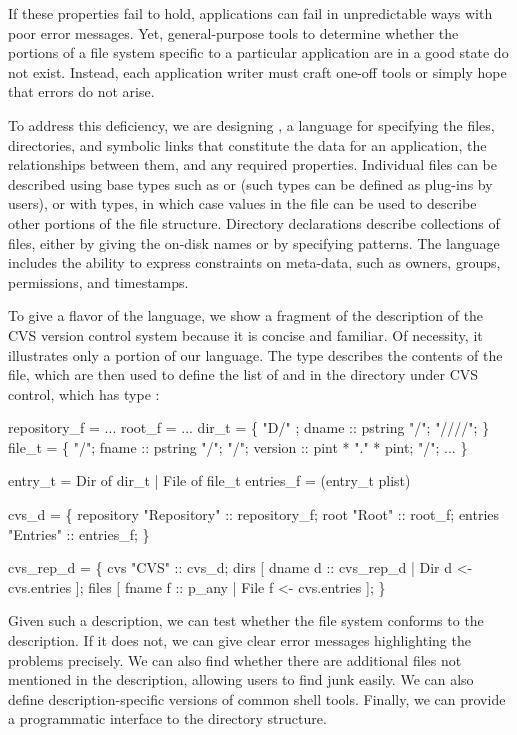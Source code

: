 \documentclass[nocopyrightspace,10pt]{sigplanconf}
\begin{document}
If these properties fail to hold, applications can fail in
unpredictable ways with poor error messages.  Yet, general-purpose
tools to determine whether the portions of a file system specific to a
particular application are in a good state do not exist.  Instead, each
application writer must craft one-off tools or simply hope that errors
do not arise. 

To address this deficiency, we are designing \dirpads{}, a language
for specifying the files, directories, and symbolic links that
constitute the data for an application, the relationships between
them, and any required properties.  Individual files can be described
using base types such as  or  (such types can be
defined as plug-ins by users), or with \pads{}
types, in which case values in the file can be used to describe other
portions of the file structure.  Directory declarations describe
collections of files, either by giving the on-disk names or by
specifying patterns.   The language
includes the ability to express constraints on meta-data, such as
owners, groups, permissions, and timestamps.  

To give a flavor of the language, we show a fragment of the
description of the CVS version control system because it is concise
and familiar.  Of necessity, it illustrates only a portion of our
language.  The \pads{} type  describes the
contents of the  file, which are then used to define the
list of  and  in the directory under CVS control,
which has \dirpads{} type :


\begin{code}
 repository_f = ...
 root_f = ...
 dir_t =  \{
  "D/" ;
  dname :: pstring "/";
  "////"; \} 
 file_t =  \{
  "/";
  fname :: pstring "/";        "/";
  version  :: pint * "." * pint;  "/";
  ... \}

 entry_t = Dir of dir_t | File of file_t
 entries_f =  (entry_t plist)

 cvs_d =  \{
  repository  "Repository" :: repository_f;
  root        "Root"       :: root_f;
  entries     "Entries"    :: entries_f; \}

  cvs_rep_d =  \{
  cvs    "CVS" :: cvs_d;
  dirs   [ dname d  :: cvs_rep_d | 
                  Dir  d <- cvs.entries ];
  files  [ fname f :: p_any      | 
                  File f <- cvs.entries ];
\}

\end{code}

Given such a description, we can test whether the file system conforms
to the description.  If it does not, we can give clear error messages
highlighting the problems precisely.  We can also find whether there
are additional files not mentioned in the description, allowing users
to find junk easily.  We can also define description-specific versions
of common shell tools.  Finally, we can provide a programmatic
interface to the directory structure.


%


\end{document}
